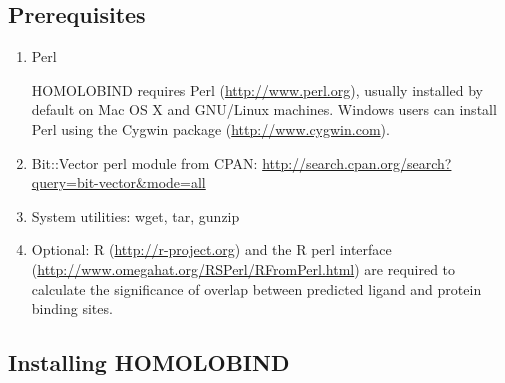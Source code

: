 \documentclass[11pt]{article}
\begin{document}
\subsection{Prerequisites}
\begin{enumerate}
\item Perl

HOMOLOBIND requires Perl (\url{http://www.perl.org}), usually installed by default on Mac OS X and GNU/Linux machines. Windows users can install Perl using the Cygwin package (\url{http://www.cygwin.com}).

\item Bit::Vector perl module from CPAN: \url{http://search.cpan.org/search?query=bit-vector&mode=all}

\item System utilities: wget, tar, gunzip

\item Optional: R (\url{http://r-project.org}) and the R perl interface (\url{http://www.omegahat.org/RSPerl/RFromPerl.html}) are required to calculate the significance of overlap between predicted ligand and protein binding sites.


\end{enumerate}

\subsection{Installing HOMOLOBIND}
\end{document}
